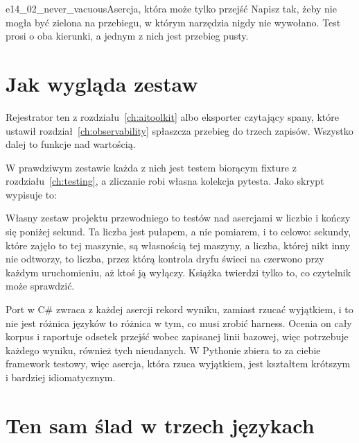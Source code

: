 \begin{exercise}{e14_02_never_vacuous}{Asercja, która może tylko przejść}
Napisz  tak, żeby nie mogła być zielona na przebiegu,
w którym narzędzia nigdy nie wywołano. Test prosi o oba kierunki, a jednym
z nich jest przebieg pusty.
\end{exercise}

\section{Jak wygląda zestaw}
\label{sec:ch14-suite}

Rejestrator \dash{} ten z rozdziału~\ref{ch:aitoolkit} albo eksporter
czytający spany, które ustawił rozdział~\ref{ch:observability} \dash{}
spłaszcza przebieg do trzech zapisów. Wszystko dalej to funkcje nad
wartością.


\noindent
W prawdziwym zestawie każda z nich jest testem biorącym fixture
 z rozdziału~\ref{ch:testing}, a zliczanie robi własna kolekcja
pytesta. Jako skrypt wypisuje to:


\noindent
Własny zestaw projektu przewodniego to  testów nad asercjami
w liczbie  i kończy się poniżej  sekund.
Ta liczba jest pułapem, a nie pomiarem, i to celowo: sekundy, które zajęło
to tej maszynie, są własnością tej maszyny, a liczba, której nikt inny nie
odtworzy, to liczba, przez którą kontrola dryfu świeci na czerwono przy
każdym uruchomieniu, aż ktoś ją wyłączy. Książka twierdzi tylko to, co
czytelnik może sprawdzić.

\begin{csbox}
Port w C\# zwraca z każdej asercji rekord wyniku, zamiast rzucać wyjątkiem,
i to nie jest różnica języków \dash{} to różnica w tym, co musi zrobić
harness. Ocenia on cały korpus i raportuje odsetek przejść wobec zapisanej
linii bazowej, więc potrzebuje każdego wyniku, również tych nieudanych. W
Pythonie zbiera to za ciebie framework testowy, więc asercja, która rzuca
wyjątkiem, jest kształtem krótszym i bardziej idiomatycznym.
\end{csbox}

\section{Ten sam ślad w trzech językach}
\label{sec:ch14-ports}

